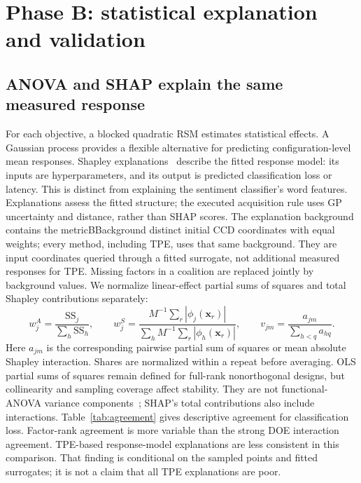 \documentclass[12pt,a4paper]{article}
\newcommand{\m}[1]{\csname metric#1\endcsname}
\begin{document}
\section{Phase B: statistical explanation and validation}
\subsection{ANOVA and SHAP explain the same measured response}
For each objective, a blocked quadratic RSM estimates statistical effects. A Gaussian process provides a flexible alternative for predicting configuration-level mean responses. Shapley explanations~\cite{shap,interactions} describe the fitted response model: its inputs are hyperparameters, and its output is predicted classification loss or latency. This is distinct from explaining the sentiment classifier's word features. Explanations assess the fitted structure; the executed acquisition rule uses GP uncertainty and distance, rather than SHAP scores.
The explanation background contains the \m{BBackground} distinct initial CCD coordinates with equal weights; every method, including TPE, uses that same background. They are input coordinates queried through a fitted surrogate, not additional measured responses for TPE. Missing factors in a coalition are replaced jointly by background values. We normalize linear-effect partial sums of squares and total Shapley contributions separately:
\begin{equation}\label{eq:shares}
w_j^{A}=\frac{\mathrm{SS}_j}{\sum_h\mathrm{SS}_h},\qquad
w_j^{S}=\frac{M^{-1}\sum_r|\phi_j(\mathbf{x}_r)|}{\sum_h M^{-1}\sum_r|\phi_h(\mathbf{x}_r)|},\qquad
v_{jm}=\frac{a_{jm}}{\sum_{h<q}a_{hq}}.
\end{equation}
Here $a_{jm}$ is the corresponding pairwise partial sum of squares or mean absolute Shapley interaction. Shares are normalized within a repeat before averaging. OLS partial sums of squares remain defined for full-rank nonorthogonal designs, but collinearity and sampling coverage affect stability. They are not functional-ANOVA variance components~\cite{fanova}; SHAP's total contributions also include interactions.
Table~\ref{tab:agreement} gives descriptive agreement for classification loss. Factor-rank agreement is more variable than the strong DOE interaction agreement. TPE-based response-model explanations are less consistent in this comparison. That finding is conditional on the sampled points and fitted surrogates; it is not a claim that all TPE explanations are poor.
\begin{table}[!htbp]\centering\small
\caption{Phase B ANOVA versus GP-surrogate SHAP agreement, averaged across searches. The factor column is Spearman rank correlation; the interaction column compares pairwise interaction strengths using correlation across pairwise strengths. These correlations are descriptive and have different estimands.}\label{tab:agreement}\end{table}
\end{document}

